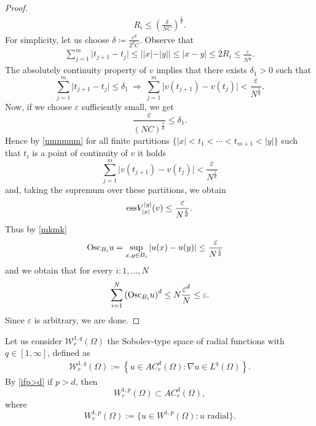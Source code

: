 \documentclass[11pt,leqno]{amsart}
\theoremstyle{remark}
\theoremstyle{definition}
\theoremstyle{definition}
\begin{document}
\begin{proof}
\begin{align*}
R_{i}\leq \left(\frac{\delta}{NC}\right)^{\frac{1}{d}}.
\end{align*}
For simplicity, let us choose $\delta\coloneqq \frac{\varepsilon^{d}}{2^{d}C}$. Observe that 
\begin{align*}
\sum_{j=1}^{m}\vert t_{j+1}-t_{j}\vert \leq \vert \vert x\vert-\vert y \vert \vert\leq \vert x-y\vert \leq 2R_{i}\leq \frac{\varepsilon}{{N^{\frac{1}{d}}}}.
\end{align*}
The absolutely continuity property of $v$ implies that there exists $\delta_1>0$ such that
\begin{equation}\label{nmnmnm}
\sum_{j=1}^{m}\vert t_{j+1}-t_{j}\vert \leq \delta_1\  \Rightarrow \ 
\sum_{j=1}^{m}\vert v(t_{j+1})-v(t_{j})\vert<  \frac{\varepsilon}{{N^{\frac{1}{d}}}}.
\end{equation}
Now, if we choose $\varepsilon$ sufficiently small, we get
$$
\frac{\varepsilon}{(NC)^{\frac{1}{d}}}\leq \delta_1.
$$
Hence by \eqref{nmnmnm} for all finite partitions $\{|x|<t_{1}<\cdots <t_{m+1}< |y|\}$ such that $t_{i}$ is a point of continuity of $v$ it holds
$$
\sum_{j=1}^{m}\vert v(t_{j+1})-v(t_{j})\vert<  \frac{\varepsilon}{{N^{\frac{1}{d}}}}
$$
and, taking the supremum over these partitions, we obtain
$$
{\rm ess} V_{\vert x\vert}^{\vert y\vert}(v)\leq  \frac{\varepsilon}{{N^{\frac{1}{d}}}}.
$$
Thus by \eqref{mkmk}
\begin{align*}
{\rm Osc}_{B_{i}}u=\sup_{x,y\in B_{i}}\vert u(x)-u(y) \vert & \leq \frac{\varepsilon}{{N^{\frac{1}{d}}}}
\end{align*}
and we obtain that for every $i:1,\dots,N$
\begin{align*}
\sum_{i=1}^N\left({\displaystyle{\rm Osc}}_{B_{i}}u\right)^{d}\leq N \frac{\varepsilon^{d}}{N}\leq \varepsilon.
\end{align*}
Since $\varepsilon$ is arbitrary, we are done. 
\end{proof}
Let us consider
${\mathcal{W}}_{r}^{1,q}(\Omega)$ the Sobolev-type space of radial functions with $q\in [1,\infty]$, defined as
\begin{align*}
{\mathcal{W}}^{1,q}_r(\Omega):=\left\{u\in AC_{r}^{d}(\Omega): \nabla u\in L^{q}(\Omega)\right\}.
\end{align*} 
By \eqref{ifp>d}
if $p>d$, then
\begin{equation*}\label{ifp>d1}
W^{1,p}_r(\Omega)\subset AC_r^{d}(\Omega),
\end{equation*}
where
\begin{equation*}\label{W1p}
W^{1,p}_r(\Omega):=\{u\in W^{1,p}(\Omega): u {\text{ radial}}
\}.
\end{equation*}
\end{document}
